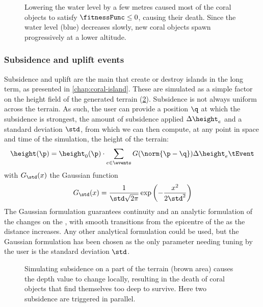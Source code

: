 \begin{figure}
    \caption{Lowering the water level by a few metres caused most of the coral objects to satisfy $\fitnessFunc \leq 0$, causing their death. Since the water level (blue) decreases slowly, new coral objects spawn progressively at a lower altitude.}
    \label{fig:env-obj-water-event}
\end{figure}

\subsubsection{Subsidence and uplift events}
Subsidence and uplift are the main  that create or destroy islands in the long term, as presented in \cref{chap:coral-island}. These  are simulated as a simple factor on the height field of the generated terrain (\cref{fig:env-obj-subsidence-event}). Subsidence is not always uniform across the terrain. As such, the user can provide a position $\q$ at which the subsidence is strongest, the amount of subsidence applied $\Delta \height_e$ and a standard deviation $\std$, from which we can then compute, at any point in space and time of the simulation, the height of the terrain:
\begin{align*}
    \height(\p) = \height_0(\p) \cdot \sum_{e \in \events}{G(\norm{\p - \q})} \Delta \height_e \tEvent
\end{align*}
with $G_{\std}(x)$ the Gaussian function
\begin{align}
    G_{\std}(x) = \frac{1}{\std \sqrt{2\pi}} \exp \left(-\frac {x^{2}}{2 \std ^{2}}\right)
\end{align}
The Gaussian formulation guarantees continuity and an analytic formulation of the changes on the , with smooth transitions from the epicentre of the  as the distance increases. Any other analytical formulation could be used, but the Gaussian formulation has been chosen as the only parameter needing tuning by the user is the standard deviation $\std$.

\begin{figure}
    \caption{Simulating subsidence on a part of the terrain (brown area) causes the depth value to change locally, resulting in the death of coral objects that find themselves too deep to survive. Here two subsidence  are triggered in parallel.}
    \label{fig:env-obj-subsidence-event}
\end{figure}

